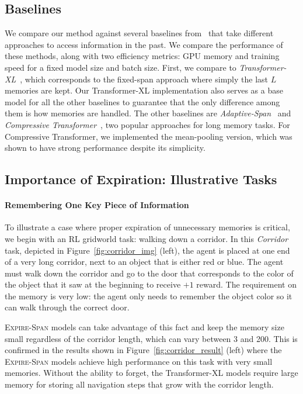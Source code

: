 \subsection{Baselines}
We compare our method against several baselines from~ that take different approaches to access information in the past. 
We compare the performance of these methods, along with two efficiency metrics: GPU memory and training speed for a fixed model size and batch size.
First, we compare to \textit{Transformer-XL}~\citep{dai2019transformer}, which corresponds to the fixed-span approach where simply the last $L$ memories are kept. 
Our Transformer-XL implementation also serves as a base model for all the other baselines to guarantee that the only difference among them is how memories are handled. 
The other baselines are \textit{Adaptive-Span}~\citep{sukhbaatar2019adaptive} and \textit{Compressive Transformer}~\citep{rae2020compressive}, two popular approaches for long memory tasks. For Compressive Transformer, we implemented the  mean-pooling version, which was shown to have strong performance despite its simplicity. 

\subsection{Importance of Expiration: Illustrative Tasks}

\paragraph{Remembering One Key Piece of Information}

To illustrate a case where proper expiration of unnecessary memories is critical, we begin with an RL gridworld task: walking down a corridor. In this \textit{Corridor} task, depicted in Figure~\ref{fig:corridor_img} (left), the agent is placed at one end of a very long corridor, next to an object that is either red or blue. The agent must walk down the corridor and go to the door that corresponds to the color of the object that it saw at the beginning to receive $+1$ reward. The requirement on the memory is very low: the agent only needs to remember the object color so it can walk through the correct door. 

\textsc{Expire-Span} models can take advantage of this fact and keep the memory size small regardless of the corridor length, which can vary between 3 and 200. 
This is confirmed in the results shown in Figure~\ref{fig:corridor_result} (left) where the \textsc{Expire-Span} models achieve high performance on this task with very small memories. 
Without the ability to forget, the Transformer-XL models require large memory for storing all navigation steps that grow with the corridor length.


